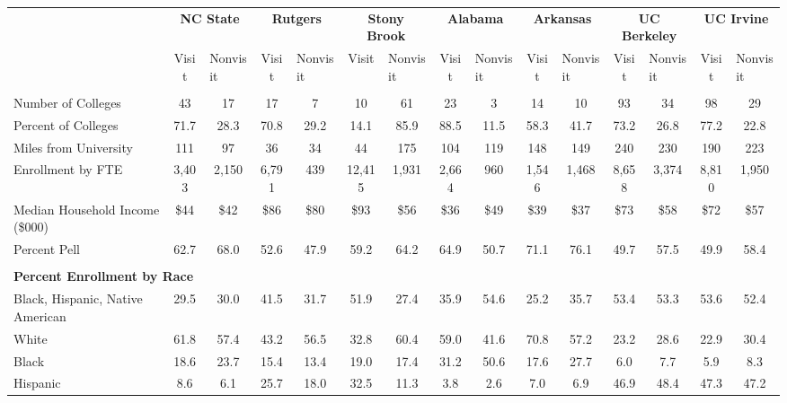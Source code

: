\begin{tabular*}{\linewidth}{@{\extracolsep{\fill} } lcccccccccccccc}%
&\multicolumn{2}{c}{\bfseries NC State}&\multicolumn{2}{c}{\bfseries Rutgers}&\multicolumn{2}{c}{\bfseries Stony Brook}&\multicolumn{2}{c}{\bfseries Alabama}&\multicolumn{2}{c}{\bfseries Arkansas}&\multicolumn{2}{c}{\bfseries UC Berkeley}&\multicolumn{2}{c}{\bfseries UC Irvine}\\%
&Visit&\multicolumn{1}{l}{Nonvisit}&Visit&\multicolumn{1}{l}{Nonvisit}&Visit&\multicolumn{1}{l}{Nonvisit}&Visit&\multicolumn{1}{l}{Nonvisit}&Visit&\multicolumn{1}{l}{Nonvisit}&Visit&\multicolumn{1}{l}{Nonvisit}&Visit&\multicolumn{1}{l}{Nonvisit}\\%
\hline%
&&&&&&&&&&&&&&\\%
\hspace{0cm}Number of Colleges&43&17&17&7&10&61&23&3&14&10&93&34&98&29\\%
Percent of Colleges&71.7&28.3&70.8&29.2&14.1&85.9&88.5&11.5&58.3&41.7&73.2&26.8&77.2&22.8\\%
\hspace{0cm}Miles from University&111&97&36&34&44&175&104&119&148&149&240&230&190&223\\%
\hspace{0cm}Enrollment by FTE&3,403&2,150&6,791&439&12,415&1,931&2,664&960&1,546&1,468&8,658&3,374&8,810&1,950\\%
\hspace{0cm}Median Household Income (\$000)&\$44&\$42&\$86&\$80&\$93&\$56&\$36&\$49&\$39&\$37&\$73&\$58&\$72&\$57\\%
\hspace{0cm}Percent Pell&62.7&68.0&52.6&47.9&59.2&64.2&64.9&50.7&71.1&76.1&49.7&57.5&49.9&58.4\\%
&&&&&&&&&&&&&&\\%
\multicolumn{15}{l}{\bfseries Percent Enrollment by Race}\\%
\hspace{0.2cm}Black, Hispanic, Native American&29.5&30.0&41.5&31.7&51.9&27.4&35.9&54.6&25.2&35.7&53.4&53.3&53.6&52.4\\%
\hspace{0.2cm}White&61.8&57.4&43.2&56.5&32.8&60.4&59.0&41.6&70.8&57.2&23.2&28.6&22.9&30.4\\%
\hspace{0.2cm}Black&18.6&23.7&15.4&13.4&19.0&17.4&31.2&50.6&17.6&27.7&6.0&7.7&5.9&8.3\\%
\hspace{0.2cm}Hispanic&8.6&6.1&25.7&18.0&32.5&11.3&3.8&2.6&7.0&6.9&46.9&48.4&47.3&47.2\\%

\end{tabular*}
